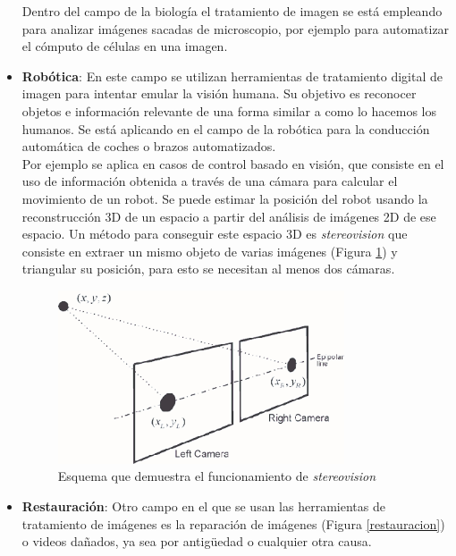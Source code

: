 \begin{itemize}
Dentro del campo de la biología el tratamiento de imagen se está empleando para analizar imágenes sacadas de microscopio, por ejemplo para automatizar el cómputo de células en una imagen.\\

\item \textbf{Robótica}: En este campo se utilizan herramientas de tratamiento digital de imagen para intentar emular la visión humana. Su objetivo es reconocer objetos e información relevante de una forma similar a como lo hacemos los humanos. Se está aplicando en el campo de la robótica para la conducción automática de coches o brazos automatizados.\\

Por ejemplo se aplica en casos de control basado en visión, que consiste en el uso de información obtenida a través de una cámara para calcular el movimiento de un robot\cite{vision}. Se puede estimar la posición del robot usando la reconstrucción 3D de un espacio a partir del análisis de imágenes 2D de ese espacio. Un método para conseguir este espacio 3D es \emph{stereovision} que consiste en extraer un mismo objeto de varias imágenes (Figura \ref{stereovision}) y triangular su posición, para esto se necesitan al menos dos cámaras\cite{stereovision}.

\begin{figure}[h]
\centering
\includegraphics[width=0.8\textwidth]{imagenes/stereovision.png}
\caption{Esquema que demuestra el funcionamiento de \emph{stereovision}}
\label{stereovision}
\end{figure}

\item \textbf{Restauración}: Otro campo en el que se usan las herramientas de tratamiento de imágenes es la reparación de imágenes (Figura \ref{restauracion}) o videos dañados, ya sea por antigüedad o cualquier otra causa. \\


\end{itemize}
